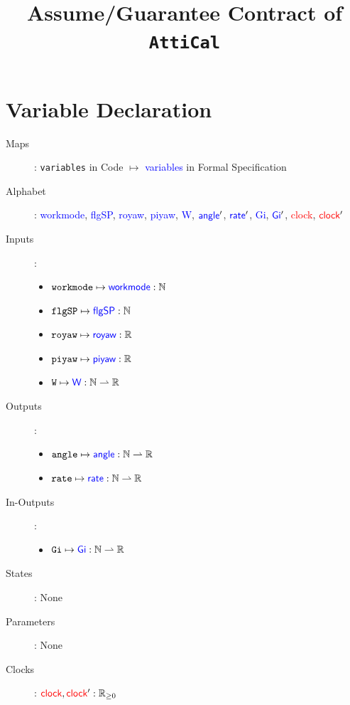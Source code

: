 \documentclass[fleqn,a4paper]{article}
\newcommand\var[1]{\texttt{#1}}
\newcommand\Var[1]{\textcolor{blue}{\textsf{#1}}}
\newcommand\clock{\textcolor{red}{\textsf{clock}}}
\begin{document}
\title{Assume/Guarantee Contract of \texttt{AttiCal}}
\author{}

\maketitle

\section{Variable Declaration}

\begin{description}

\item[Maps]:
\var{variables} in Code $\mapsto$ \Var{variables} in Formal Specification

\item[Alphabet]:
\Var{workmode},
\Var{flgSP},
\Var{royaw},
\Var{piyaw},
\Var{W},
$\Var{angle}'$,
$\Var{rate}'$,
\Var{Gi},
$\Var{Gi}'$,
\clock,
$\clock'$

\item[Inputs]:
\begin{itemize}
\item $\var{workmode} \mapsto \Var{workmode} : \mathbb{N}$
\item $\var{flgSP} \mapsto \Var{flgSP} : \mathbb{N}$
\item $\var{royaw} \mapsto \Var{royaw} : \mathbb{R}$
\item $\var{piyaw} \mapsto \Var{piyaw} : \mathbb{R}$
\item $\var{W} \mapsto \Var{W} : \mathbb{N} \rightharpoonup \mathbb{R}$
\end{itemize}

\item[Outputs]:
\begin{itemize}
\item $\var{angle} \mapsto \Var{angle} : \mathbb{N} \rightharpoonup \mathbb{R}$
\item $\var{rate} \mapsto \Var{rate} : \mathbb{N} \rightharpoonup \mathbb{R}$
\end{itemize}

\item[In-Outputs]: 
\begin{itemize}
\item $\var{Gi} \mapsto \Var{Gi} : \mathbb{N} \rightharpoonup \mathbb{R}$
\end{itemize}

\item[States]: None

\item[Parameters]: None

\item[Clocks]:
$\clock, \clock': \mathbb{R}_{\geq0}$

\end{description}
\end{document}
